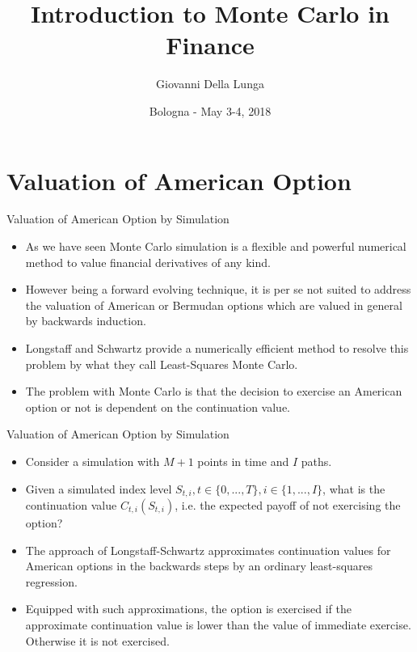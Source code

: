 \documentclass[11pt]{beamer}
\author{Giovanni Della Lunga}
\title{Introduction to Monte Carlo in Finance}
\institute{WORKSHOP IN QUANTITATIVE FINANCE}
\date{Bologna - May 3-4, 2018}
\begin{document}
\begin{frame}
\titlepage
\end{frame}


\section{Valuation of American Option}
\begin{frame}{Valuation of American Option by Simulation}
\begin{itemize}
\item As we have seen Monte Carlo simulation is a flexible and powerful numerical method to value financial derivatives of any kind. 
\item However being a forward evolving technique, it is per se not suited to address the valuation of American or Bermudan options which are valued in general by backwards induction. 
\item Longstaff and Schwartz provide a numerically efficient method to resolve this problem by what they call Least-Squares Monte Carlo. 
\item  The problem with Monte Carlo is that the decision to exercise an American option or not is dependent on the continuation value. 
\end{itemize}
\end{frame}
\begin{frame}{Valuation of American Option by Simulation}
\begin{itemize}
\item  Consider a simulation with $M + 1$ points in time and $I$ paths. 
\item Given a simulated index level $S_{t,i} , t\in \{0, ..., T \}, i \in \{1, ..., I \}$, what is the continuation value $C_{t,i}(S_{t,i})$, i.e. the expected payoff of not exercising the option? 
\item The approach of Longstaff-Schwartz approximates continuation values for American options in the backwards steps by an ordinary least-squares regression.
\item Equipped with such approximations, the option is exercised if the approximate continuation value is lower than the value of immediate exercise. Otherwise it is not exercised.
\end{itemize}
\end{frame}
\end{document}
